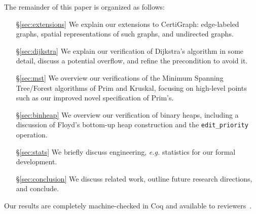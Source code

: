 The remainder of this paper is organized as follows:
\begin{itemize}
    \item[\S\ref{sec:extensions}] We explain our extensions to CertiGraph:
    edge-labeled graphs, spatial representations of such graphs, and
    undirected graphs.
    \item[\S\ref{sec:dijkstra}] We explain our verification of Dijkstra's algorithm in some detail, discuss a potential overflow, and refine the precondition to avoid it. %
    \item[\S\ref{sec:mst}] We overview our verifications of the Minimum Spanning Tree/Forest algorithms of Prim and Kruskal, focusing on high-level points such as our improved novel specification of Prim's.
    \item[\S\ref{sec:binheap}] We overview our verification of binary heaps, including a discussion of Floyd's bottom-up heap construction and the \texttt{edit\_priority} operation.
    \item[\S\ref{sec:stats}] We briefly discuss engineering, \emph{e.g.} statistics for our formal development.
    \item[\S\ref{sec:conclusion}] We discuss related work, outline future research directions, and conclude.
\end{itemize}

\noindent Our results are completely machine-checked in Coq and available to reviewers~\cite{anonrepo}.%
